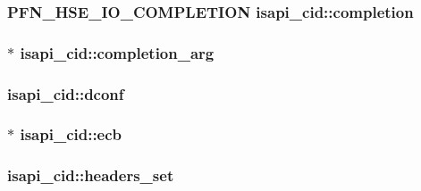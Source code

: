 \subsubsection[{\texorpdfstring{completion}{completion}}]{\setlength{\rightskip}{0pt plus 5cm}P\+F\+N\+\_\+\+H\+S\+E\+\_\+\+I\+O\+\_\+\+C\+O\+M\+P\+L\+E\+T\+I\+ON isapi\+\_\+cid\+::completion}\hypertarget{structisapi__cid_aa8a9f34b7b87f8742150c3cd22d6cfec}{}\label{structisapi__cid_aa8a9f34b7b87f8742150c3cd22d6cfec}
\subsubsection[{\texorpdfstring{completion\+\_\+arg}{completion_arg}}]{$\ast$ isapi\+\_\+cid\+::completion\+\_\+arg}\hypertarget{structisapi__cid_a6d796fbfc7d16f86e3f9cbcb85a7ba90}{}\label{structisapi__cid_a6d796fbfc7d16f86e3f9cbcb85a7ba90}
\subsubsection[{\texorpdfstring{dconf}{dconf}}]{ isapi\+\_\+cid\+::dconf}\hypertarget{structisapi__cid_aac3d90fd58a03f63d36749a9c5f0c0d2}{}\label{structisapi__cid_aac3d90fd58a03f63d36749a9c5f0c0d2}
\subsubsection[{\texorpdfstring{ecb}{ecb}}]{$\ast$ isapi\+\_\+cid\+::ecb}\hypertarget{structisapi__cid_ab88ba7d4ff61c15e25e554823d03bdd0}{}\label{structisapi__cid_ab88ba7d4ff61c15e25e554823d03bdd0}
\subsubsection[{\texorpdfstring{headers\+\_\+set}{headers_set}}]{ isapi\+\_\+cid\+::headers\+\_\+set}\hypertarget{structisapi__cid_a6b64d85e3dc239af8883316d1c0af64c}{}\label{structisapi__cid_a6b64d85e3dc239af8883316d1c0af64c}
